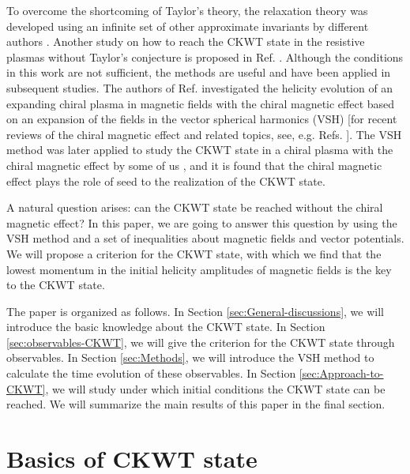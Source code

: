 \documentclass[english,aps,superscriptaddress,preprint]{revtex4-1}
\begin{document}
To overcome the shortcoming of Taylor's theory, the relaxation theory
was developed using an infinite set of other approximate invariants
by different authors \citep{Bhattacharjee1980,Bhattacharjee1982}.
Another study on how to reach the CKWT state in the resistive plasmas
without Taylor's conjecture is proposed in Ref. \citep{Qin2012}.
Although the conditions in this work are not sufficient, the methods
are useful and have been applied in subsequent studies. The authors
of Ref. \citep{Hirono:2015rla} investigated the helicity evolution
of an expanding chiral plasma in magnetic fields with the chiral magnetic
effect \citep{Vilenkin:1980fu,Kharzeev:2007jp,Fukushima:2008xe} based
on an expansion of the fields in the vector spherical harmonics (VSH)
{[}for recent reviews of the chiral magnetic effect and related topics,
see, e.g. Refs. \citep{Kharzeev:2012ph,Kharzeev:2015znc}{]}. The
VSH method was later applied to study the CKWT state in a chiral plasma
with the chiral magnetic effect by some of us \citep{Xia:2016any},
and it is found that the chiral magnetic effect plays the role of
seed to the realization of the CKWT state.

A natural question arises: can the CKWT state be reached without the
chiral magnetic effect? In this paper, we are going to answer this
question by using the VSH method and a set of inequalities about magnetic
fields and vector potentials. We will propose a criterion for the
CKWT state, with which we find that the lowest momentum in the initial
helicity amplitudes of magnetic fields is the key to the CKWT state. 

The paper is organized as follows. In Section \ref{sec:General-discussions},
we will introduce the basic knowledge about the CKWT state. In Section
\ref{sec:observables-CKWT}, we will give the criterion for the CKWT
state through observables. In Section \ref{sec:Methods}, we will
introduce the VSH method to calculate the time evolution of these
observables. In Section \ref{sec:Approach-to-CKWT}, we will study
under which initial conditions the CKWT state can be reached. We will
summarize the main results of this paper in the final section.

\section{Basics of CKWT state \label{sec:General-discussions}}
\end{document}
